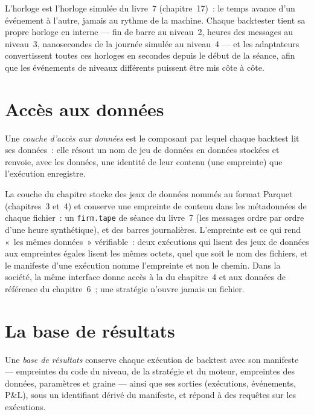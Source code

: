 \label{lst:pl:backtest-engine-architecture:events}

L'horloge est l'horloge simulée du livre~7 (chapitre~17)~: le temps avance d'un événement à l'autre, jamais au rythme de la machine. Chaque backtester tient
sa propre horloge en interne --- fin de barre au niveau~2, heures des messages au niveau~3, nanosecondes de la journée simulée au niveau~4 --- et les adaptateurs
convertissent toutes ces horloges en secondes depuis le début de la séance, afin que les événements de niveaux différents puissent être mis côte à côte.

\section{Accès aux données}

\begin{definition}\label{def:pl:backtest-engine-architecture:dal}
Une \emph{couche d'accès aux données} est le composant par lequel chaque backtest lit ses données~: elle résout un nom de jeu de données
en données stockées et renvoie, avec les données, une identité de leur contenu (une empreinte) que l'exécution enregistre.
\end{definition}

La couche du chapitre stocke des jeux de données nommés au format Parquet (chapitres~3 et~4) et conserve une empreinte de contenu dans les métadonnées de chaque fichier~: un
\texttt{firm.tape} de séance du livre~7 (les messages ordre par ordre d'une heure synthétique), et des barres journalières. L'empreinte est ce qui rend «~les mêmes données~» vérifiable~: deux exécutions
qui lisent des jeux de données aux empreintes égales lisent les mêmes octets, quel que soit le nom des fichiers, et le manifeste d'une exécution
nomme l'empreinte et non le chemin. Dans la société, la même interface donne accès à la  du chapitre~4 et aux données de référence du
chapitre~6~; une stratégie n'ouvre jamais un fichier.

\section{La base de résultats}

\begin{definition}\label{def:pl:backtest-engine-architecture:results}
Une \emph{base de résultats} conserve chaque exécution de backtest avec son manifeste --- empreintes du code du niveau, de la stratégie et du moteur, empreintes des données,
paramètres et graine --- ainsi que ses sorties (exécutions, événements, P\&L),
sous un identifiant dérivé du manifeste, et répond à des requêtes sur les exécutions.
\end{definition}


